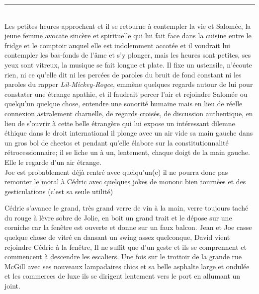\begin{center}\noindent\rule{0.5\textwidth}{0.4pt}\end{center}\\
Les petites heures approchent et il se retourne à contempler la vie et Salomée,
la jeune femme avocate sincère et spirituelle qui lui fait face dans la cuisine
entre le fridge et le comptoir auquel elle est indolemment accotée et
il voudrait lui contempler les bas-fonds de l'âme et s'y plonger,
mais les heures sont petites, ses yeux sont vitreux, la musique
se fait longue et plate.
Il fixe un ustensile, n'écoute rien, ni ce qu'elle dit ni les percées de
paroles du bruit de fond constant ni les paroles du rapper
\textit{Lil-Mickey-Royce}, emmène quelques regards autour de lui pour constater
une étrange apathie, et il faudrait percer l'air et rejoindre Salomée ou quelqu'un
quelque chose, entendre une sonorité humaine mais en lieu
de réelle connexion astralement charnelle, de regards croisés,
de discussion authentique, en lieu de s'ouvrir à cette belle étrangère
qui lui expose un intéressant dilemne éthique dans le droit international
il plonge avec un air vide sa main gauche dans un gros bol de cheetos et
pendant qu'elle élabore sur la constitutionnalité rétrocessionnaire; il se
liche un à un, lentement, chaque doigt de la main gauche. Elle le regarde d'un
air étrange. \\


Joe est probablement déjà rentré avec quelqu'un(e) il ne pourra donc pas
remonter le moral à Cédric avec quelques jokes de mononc bien tournées et des
gesticulations (c'est sa seule utilité)

Cédric s'avance le grand, très grand verre de vin à la main, verre toujours
taché du rouge à lèvre sobre de Jolie, en boit un grand
trait et le dépose sur une corniche car la fenêtre est ouverte et donne sur un
faux balcon. Jean et Joe casse quelque chose de vitré en dansant un swing assez
quelconque, David vient rejoindre Cédric à la fenêtre, Il ne suffit que d'un
geste et ils se comprennent et commencent à descendre les escaliers. Une fois
sur le trottoir de la grande rue McGill avec ses nouveaux lampadaires chics et
sa belle asphalte large et ondulée et les commerces de luxe ils se dirigent
lentement vers le port en allumant un joint. 

